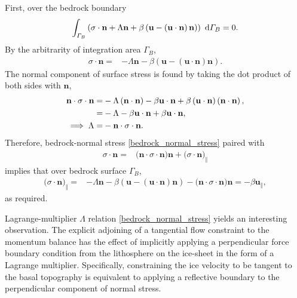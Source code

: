 First, over the bedrock boundary
\begin{align*}
  \int_{\varGamma_B} \left( \sigma \cdot \mathbf{n}
  + \Lambda \mathbf{n} + \beta \left( \mathbf{u} - \left( \mathbf{u} \cdot \mathbf{n} \right) \mathbf{n} \right) \right) \ \mathrm{d}\varGamma_B = 0.
\end{align*}
By the arbitrarity of integration area $\Gamma_B$,
\begin{align}
  \label{bedrock_traction}
  \sigma \cdot \mathbf{n} =
  &- \Lambda \mathbf{n} - \beta \left( \mathbf{u} - \left( \mathbf{u} \cdot \mathbf{n} \right) \mathbf{n} \right).
\end{align}
The normal component of surface stress is found by taking the dot product of both sides with $\mathbf{n}$,
\begin{align}
  \mathbf{n} \cdot \sigma \cdot \mathbf{n}
  =&- \Lambda \left( \mathbf{n} \cdot \mathbf{n} \right) - \beta \mathbf{u} \cdot \mathbf{n} + \beta \left( \mathbf{u} \cdot \mathbf{n} \right) \left( \mathbf{n} \cdot \mathbf{n} \right), \notag \\
  =&- \Lambda - \beta \mathbf{u} \cdot \mathbf{n} + \beta \mathbf{u} \cdot \mathbf{n}, \notag \\
  \label{bedrock_normal_stress}
  \implies \Lambda = &- \mathbf{n} \cdot \sigma \cdot \mathbf{n}.
\end{align}
Therefore, bedrock-normal stress \cref{bedrock_normal_stress} paired with
\begin{align*}
  \sigma \cdot \mathbf{n}
  =& \big( \mathbf{n} \cdot \sigma \cdot \mathbf{n} \big) \mathbf{n} + \big( \sigma \cdot \mathbf{n} \big)_{\Vert}
\end{align*}
implies that over bedrock surface $\Gamma_B$,
\begin{align*}
  \big( \sigma \cdot \mathbf{n} \big)_{\Vert} = & - \Lambda \mathbf{n} - \beta \left( \mathbf{u} - \left( \mathbf{u} \cdot \mathbf{n} \right) \mathbf{n} \right) - \big( \mathbf{n} \cdot \sigma \cdot \mathbf{n} \big) \mathbf{n}
  = - \beta \mathbf{u}_{\Vert},
\end{align*}
as required.

Lagrange-multiplier $\Lambda$ relation \cref{bedrock_normal_stress} yields an interesting observation.
The explicit adjoining of a tangential flow constraint to the momentum balance has the effect of implicitly applying a perpendicular force boundary condition from the lithosphere on the ice-sheet in the form of a Lagrange multiplier.
Specifically, constraining the ice velocity to be tangent to the basal topography is equivalent to applying a reflective boundary to the perpendicular component of normal stress.

